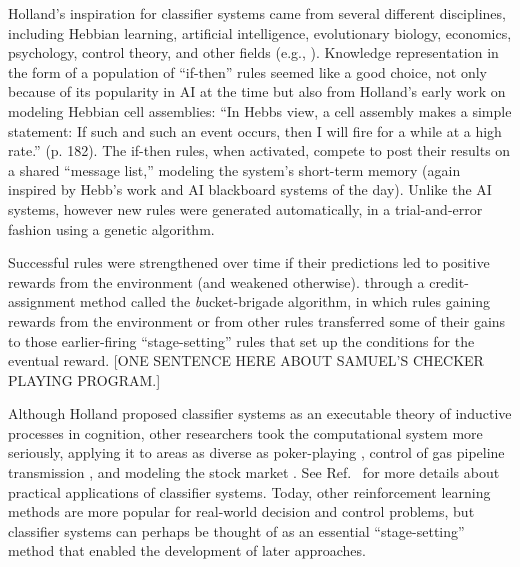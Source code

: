 \documentclass{sig-alternate}
\begin{document}

Holland's inspiration for classifier systems came from several
different disciplines, including Hebbian
learning, artificial intelligence, evolutionary biology, economics,
psychology, control theory, and other fields (e.g.,
\cite{Bellman1961,Samuel1959}).  Knowledge representation in the form of a
population of ``if-then'' rules seemed like a good choice, not only
because of its popularity in AI at the time but also from Holland's
early work on modeling Hebbian cell assemblies: ``In Hebbs view, a
cell assembly makes a simple statement: If such and such an event
occurs, then I will fire for a while at a high
rate.'' \cite{Waldrop1993} (p. 182).  
The if-then rules, when activated, compete to post their results on a
shared ``message list,'' modeling the system's short-term memory
(again inspired by Hebb's work and AI blackboard systems of the day).
Unlike the AI systems, however new rules were generated automatically,
in a trial-and-error fashion using a
genetic algorithm.  

Successful rules were
strengthened over time if their predictions led to positive rewards
from the environment 
(and weakened otherwise).  
through a credit-assignment method
called the {\emph bucket-brigade} algorithm, in which rules gaining
rewards from the environment or from other rules transferred some
of their gains to those earlier-firing ``stage-setting'' rules that
set up the conditions for the eventual reward.   [ONE SENTENCE HERE
ABOUT SAMUEL'S CHECKER PLAYING PROGRAM.]

Although Holland proposed classifier systems as an executable theory
of inductive processes in cognition, other researchers took the
computational system more seriously, applying it to areas as diverse
as poker-playing \cite{Smith1980}, control of gas pipeline
transmission \cite{Goldberg1983}, and modeling the stock market
\cite{Palmer1994}.  See Ref.~\cite{Booker1989} for more details about
practical applications of classifier systems.  Today, other
reinforcement learning methods are more popular for real-world
decision and control problems, but classifier systems can perhaps be
thought of as an essential ``stage-setting'' method that enabled the
development of later approaches.
\end{document}

